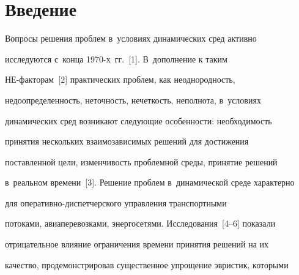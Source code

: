   




  




   




   


    \thispagestyle{headings}


    


    \vspace*{-12pt}





\section{Введение}





  Вопросы решения проблем в~условиях динамических сред активно 


исследуются с~конца 1970-х~гг.~[1]. В~дополнение к таким  


НЕ-фак\-то\-рам~[2] практических проблем, как неоднородность, 


недоопределенность, неточность, нечеткость, неполнота, в~условиях 


динамических сред возникают следующие особенности: необходимость 


принятия нескольких взаимозависимых решений для достижения 


поставленной цели, изменчивость проблемной среды, принятие решений 


в~реальном времени~[3]. Решение проблем в~динамической среде характерно 


для опе\-ра\-тив\-но-дис\-пет\-чер\-ско\-го управ\-ле\-ния транспортными 


потоками, авиаперевозками, энергосетями. Исследования~[4--6] показали 


отрицательное влияние ограничения времени принятия решений на их 


качество, продемонстрировав существенное упрощение эвристик, которыми 


